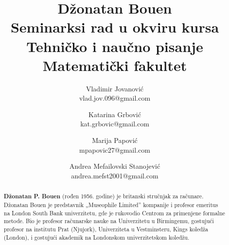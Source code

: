 \documentclass[a4paper]{article}
\begin{document}
\title{Džonatan Bouen\\ \small{Seminarksi rad u okviru kursa\\ Tehničko i naučno pisanje\\ Matematički fakultet}}

\author{Vladimir Jovanović\\vlad.jov.096@gmail.com \and Katarina Grbović\\kat.grbovic@gmail.com \and Marija Papović\\mpapovic27@gmail.com\and Andrea Mefailovski Stanojević\\andrea.mefst2001@gmail.com}
\date{}
\maketitle

\begin{abstract}
\textbf{Džonatan P. Bouen} (rođen 1956. godine) je britanski stručnjak za računare.
Džonatan Bouen je predstavnik „Museophile Limited” kompanije i profesor emeritus na London South Bank univerzitetu, gde je rukovodio Centrom za primenjene formalne metode\cite{btu}. Bio je profesor računarske nauke na Univerzitetu u Birmingemu\cite{ctn}, gostujući profesor na institutu Prat (Njujork), Univerziteta u Vestminsteru, Kings koledža (London)\cite{crest}, i gostujući akademik na Londonskom univerzitetskom koledžu\cite{homepage}.
\end{abstract}

\tableofcontents
\newpage
\end{document}
